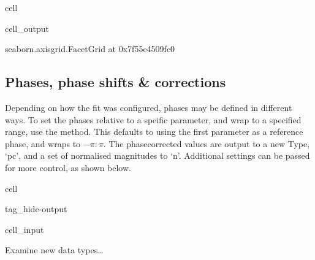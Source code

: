 \documentclass[letterpaper,table,10pt,english]{jupyterBook}
\begin{document}
\begin{sphinxuseclass}{cell}
\begin{sphinxVerbatimOutput}
\begin{sphinxuseclass}{cell_output}
\begin{sphinxVerbatim}[commandchars=\\\{\}]
\PYGZlt{}seaborn.axisgrid.FacetGrid at 0x7f55e4509fc0\PYGZgt{}
\end{sphinxVerbatim}

\noindent{}

\end{sphinxuseclass}\end{sphinxVerbatimOutput}

\end{sphinxuseclass}

\subsection{Phases, phase shifts \& corrections}
\label{\detokenize{part2/case-study-N2_290723:phases-phase-shifts-corrections}}
\sphinxAtStartPar
Depending on how the fit was configured, phases may be defined in different ways. To set the phases relative to a speific parameter, and wrap to a specified range, use the  method. This defaults to using the first parameter as a reference phase, and wraps to \(-\pi:\pi\). The phase\sphinxhyphen{}corrected values are output to a new Type, ‘pc’, and a set of normalised magnitudes to ‘n’. Additional settings can be passed for more control, as shown below.

\begin{sphinxuseclass}{cell}
\begin{sphinxuseclass}{tag_hide-output}\begin{sphinxVerbatimInput}

\begin{sphinxuseclass}{cell_input}
\begin{sphinxVerbatim}[commandchars=\\\{\}]
 
\end{sphinxVerbatim}

\end{sphinxuseclass}\end{sphinxVerbatimInput}

\end{sphinxuseclass}
\end{sphinxuseclass}
\sphinxAtStartPar
Examine new data types…
\end{document}

